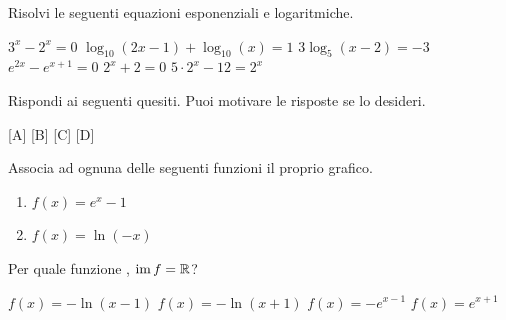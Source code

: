 \documentclass[10pt]{article}
\begin{document}
\testheader[date=20/03/2026, title={Logaritmo, equazioni esponenziali e logaritmiche}]

\exercise Risolvi le seguenti equazioni esponenziali e logaritmiche.

\begin{parts}[cols=2]
  \itemx[pts=1] $3^x - 2^x = 0$
  \itemx[pts=1] $\log_{10}(2x - 1) + \log_{10}(x) = 1$
  \itemx[pts=1] $3 \log_5(x - 2) = -3$
  \itemx[pts=1] $e^{2x} - e^{x + 1} = 0$
  \itemx[pts=1, noreduced] $2^x + 2 = 0$
  \itemx[pts=1, noreduced] $5 \cdot 2^x - 12 = 2^x$
\end{parts}

\exercise Rispondi ai seguenti quesiti. Puoi motivare le risposte se lo desideri.

\medskip
\begin{minipage}[c]{.39\linewidth}
  \centering
  \begin{ftplot}[xmin=-4.9, xmax=5.1, ymin=-4.9, ymax=5.1]
    [A]
    [B]
    [C]
    [D]
  \end{ftplot}
\end{minipage}
\hfill
\begin{minipage}[c]{.6\linewidth}
  \begin{parts}[ragged]
    \itemx[pts=1] Associa ad ognuna delle seguenti funzioni il proprio grafico.
      \begin{enumerate}[itemsep=.2em, topsep=2pt, label=\textbf{(\roman*)}]
        \item $f(x) = e^x - 1$ \dotfill
        \item $f(x) = \ln(-x)$ \dotfill
      \end{enumerate}
    \itemx[pts=1, diff=2] Per quale funzione , $\Ima f = \spR$?
      \begin{choices}
        \correct[if={dom=1}] $f(x) = -\ln(x - 1)$
        \correct[if={dom=2}] $f(x) = -\ln(x + 1)$
        \choice $f(x) = -e^{x - 1}$
        \choice $f(x) = e^{x + 1}$
      \end{choices}
  \end{parts}
\end{minipage}
\end{document}
